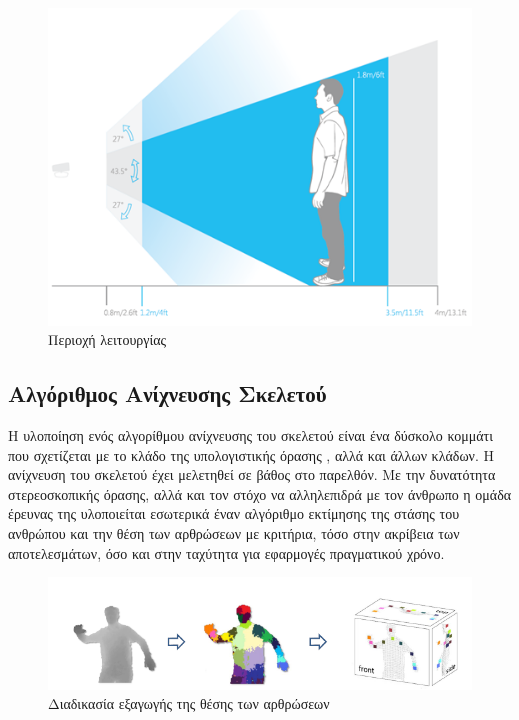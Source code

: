 \begin{figure}[H]
    \centering
    \includegraphics[width=.8\textwidth, height=.35\textheight]{kinect/fig/kinect-operation-mode.png}
    \caption{Περιοχή λειτουργίας\protect\footnotemark}
    \label{fig:kinect-operation-mode}
\end{figure}

\subsection{Αλγόριθμος Ανίχνευσης Σκελετού}

Η υλοποίηση ενός αλγορίθμου ανίχνευσης του σκελετού είναι ένα δύσκολο κομμάτι που σχετίζεται με το κλάδο της υπολογιστικής όρασης \cite{mubarak97}, αλλά και άλλων κλάδων. Η ανίχνευση του σκελετού έχει μελετηθεί σε βάθος \cite{moseslund01, poppe07} στο παρελθόν. Με την δυνατότητα στερεοσκοπικής όρασης, αλλά και τον στόχο να αλληλεπιδρά με τον άνθρωπο η ομάδα έρευνας της  υλοποιείται εσωτερικά έναν αλγόριθμο εκτίμησης της στάσης του ανθρώπου και την θέση των αρθρώσεων \cite{shotton11} με κριτήρια, τόσο στην ακρίβεια των αποτελεσμάτων, όσο και στην ταχύτητα για εφαρμογές πραγματικού χρόνο.

\begin{figure}[H]
    \centering
    \includegraphics[width=.9\textwidth]{kinect/fig/kinect-skeleton-algorithm.png}
    \caption{Διαδικασία εξαγωγής της θέσης των αρθρώσεων\cite{shotton11}}
    \label{fig:kinect-skeleton-algorithm}
\end{figure}

